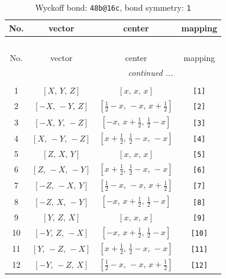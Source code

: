 \documentclass[fleqn,8pt]{jsarticle}
\begin{document}
\begin{longtable}{cccc}
\caption{Wyckoff bond: {\tt 48b@16c}, bond symmetry: {\tt 1}}
 \\
 \hline \hline
No. & vector & center & mapping \\ \hline \endfirsthead

\multicolumn{3}{l}{\tablename\ \thetable{}} \\
 \hline \hline
No. & vector & center & mapping \\ \hline \endhead

 \hline \hline
\multicolumn{3}{r}{\footnotesize\it continued ...} \\ \endfoot

 \hline \hline
\multicolumn{3}{r}{} \\ \endlastfoot

1 & $\left[ X,\, Y,\, Z \right]$ & $\left[ x,\, x,\, x \right]$ & {\tt [1]} \\ \hline
2 & $\left[ - X,\, - Y,\, Z \right]$ & $\left[ \frac{1}{2} - x,\, - x,\, x + \frac{1}{2} \right]$ & {\tt [2]} \\ \hline
3 & $\left[ - X,\, Y,\, - Z \right]$ & $\left[ - x,\, x + \frac{1}{2},\, \frac{1}{2} - x \right]$ & {\tt [3]} \\ \hline
4 & $\left[ X,\, - Y,\, - Z \right]$ & $\left[ x + \frac{1}{2},\, \frac{1}{2} - x,\, - x \right]$ & {\tt [4]} \\ \hline
5 & $\left[ Z,\, X,\, Y \right]$ & $\left[ x,\, x,\, x \right]$ & {\tt [5]} \\ \hline
6 & $\left[ Z,\, - X,\, - Y \right]$ & $\left[ x + \frac{1}{2},\, \frac{1}{2} - x,\, - x \right]$ & {\tt [6]} \\ \hline
7 & $\left[ - Z,\, - X,\, Y \right]$ & $\left[ \frac{1}{2} - x,\, - x,\, x + \frac{1}{2} \right]$ & {\tt [7]} \\ \hline
8 & $\left[ - Z,\, X,\, - Y \right]$ & $\left[ - x,\, x + \frac{1}{2},\, \frac{1}{2} - x \right]$ & {\tt [8]} \\ \hline
9 & $\left[ Y,\, Z,\, X \right]$ & $\left[ x,\, x,\, x \right]$ & {\tt [9]} \\ \hline
10 & $\left[ - Y,\, Z,\, - X \right]$ & $\left[ - x,\, x + \frac{1}{2},\, \frac{1}{2} - x \right]$ & {\tt [10]} \\ \hline
11 & $\left[ Y,\, - Z,\, - X \right]$ & $\left[ x + \frac{1}{2},\, \frac{1}{2} - x,\, - x \right]$ & {\tt [11]} \\ \hline
12 & $\left[ - Y,\, - Z,\, X \right]$ & $\left[ \frac{1}{2} - x,\, - x,\, x + \frac{1}{2} \right]$ & {\tt [12]} \\ \hline

\end{longtable}
\end{document}
